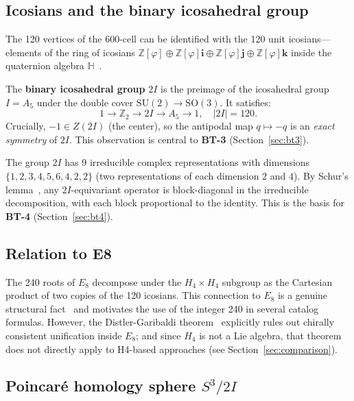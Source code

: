 \documentclass[12pt,a4paper]{article}
\newcommand{\TwoI}{2I}
\newcommand{\BT}[1]{\textbf{BT-#1}}
\begin{document}
\subsection{Icosians and the binary icosahedral group}

The 120 vertices of the 600-cell can be identified with the 120 unit icosians---elements of
the ring of icosians \(\mathbb{Z}[\varphi] \oplus \mathbb{Z}[\varphi]\mathbf{i}
\oplus \mathbb{Z}[\varphi]\mathbf{j} \oplus \mathbb{Z}[\varphi]\mathbf{k}\)
inside the quaternion algebra \(\mathbb{H}\)~\cite{Conway:2003}.

The \textbf{binary icosahedral group} \(\TwoI\) is the preimage of the icosahedral group
\(I = A_5\) under the double cover \(\mathrm{SU}(2) \to \mathrm{SO}(3)\). It satisfies:
\begin{equation}
  1 \to \mathbb{Z}_2 \to \TwoI \to A_5 \to 1,
  \quad |\TwoI| = 120.
  \label{eq:2Iextension}
\end{equation}
Crucially, \(-1 \in Z(\TwoI)\) (the center), so the antipodal map \(q \mapsto -q\) is
an \emph{exact symmetry} of \(\TwoI\). This observation is central to \BT{3}
(Section~\ref{sec:bt3}).

The group \(\TwoI\) has 9 irreducible complex representations with dimensions
\(\{1, 2, 3, 4, 5, 6, 4, 2, 2\}\) (two representations of each dimension \(2\) and \(4\)).
By Schur's lemma~\cite{Serre:1977}, any \(\TwoI\)-equivariant operator is block-diagonal in
the irreducible decomposition, with each block proportional to the identity.
This is the basis for \BT{4} (Section~\ref{sec:bt4}).

\subsection{Relation to E8}

The 240 roots of \(E_8\) decompose under the \(H_4 \times H_4\) subgroup as the Cartesian
product of two copies of the 120 icosians. This connection to \(E_8\) is a genuine structural
fact~\cite{Baez:2002rd} and motivates the use of the integer 240 in several catalog formulas.
However, the Distler-Garibaldi theorem~\cite{Distler:2009dm} explicitly rules out chirally
consistent unification inside \(E_8\); and since \(H_4\) is not a Lie algebra, that theorem
does not directly apply to H4-based approaches (see Section~\ref{sec:comparison}).

\subsection{Poincar\'e homology sphere \(S^3/\TwoI\)}
\end{document}
